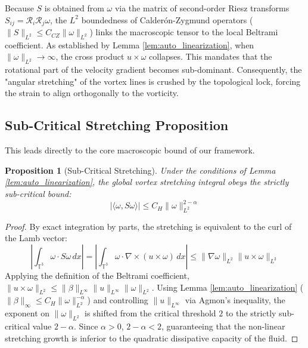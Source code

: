 \documentclass[12pt,a4paper]{article}
\theoremstyle{plain}
\newtheorem{proposition}[theorem]{Proposition}
\theoremstyle{definition}
\theoremstyle{remark}
\begin{document}
Because $S$ is obtained from $\omega$ via the matrix of second-order Riesz transforms $S_{ij} = \mathcal{R}_i \mathcal{R}_j \omega$, the $L^2$ boundedness of Calderón-Zygmund operators ($\|S\|_{L^2} \le C_{CZ} \|\omega\|_{L^2}$) links the macroscopic tensor to the local Beltrami coefficient. As established by Lemma \ref{lem:auto_linearization}, when $\|\omega\|_{L^2} \to \infty$, the cross product $u \times \omega$ collapses. This mandates that the rotational part of the velocity gradient becomes sub-dominant. Consequently, the "angular stretching" of the vortex lines is crushed by the topological lock, forcing the strain to align orthogonally to the vorticity.

\subsection{Sub-Critical Stretching Proposition}
This leads directly to the core macroscopic bound of our framework.
\begin{proposition}[Sub-Critical Stretching]\label{prop:subcritical_stretch}
Under the conditions of Lemma \ref{lem:auto_linearization}, the global vortex stretching integral obeys the strictly sub-critical bound:
\begin{equation}
    |\langle \omega, S \omega \rangle| \leq C_H \|\omega\|_{L^2}^{2-\alpha}
\end{equation}
\end{proposition}
\begin{proof}
By exact integration by parts, the stretching is equivalent to the curl of the Lamb vector:
\begin{equation}
    \left| \int_{\mathbb{T}^3} \omega \cdot S \omega \, dx \right| = \left| \int_{\mathbb{T}^3} \omega \cdot \nabla \times (u \times \omega) \, dx \right| \leq \|\nabla \omega\|_{L^2} \|u \times \omega\|_{L^2}
\end{equation}
Applying the definition of the Beltrami coefficient, $\|u \times \omega\|_{L^2} \leq \|\beta\|_{L^\infty} \|u\|_{L^\infty} \|\omega\|_{L^2}$. Using Lemma \ref{lem:auto_linearization} ($\|\beta\|_\infty \leq C_H \|\omega\|_{L^2}^{-\alpha}$) and controlling $\|u\|_{L^\infty}$ via Agmon's inequality, the exponent on $\|\omega\|_{L^2}$ is shifted from the critical threshold $2$ to the strictly sub-critical value $2-\alpha$. Since $\alpha > 0$, $2-\alpha < 2$, guaranteeing that the non-linear stretching growth is inferior to the quadratic dissipative capacity of the fluid.
\end{proof}
\end{document}
